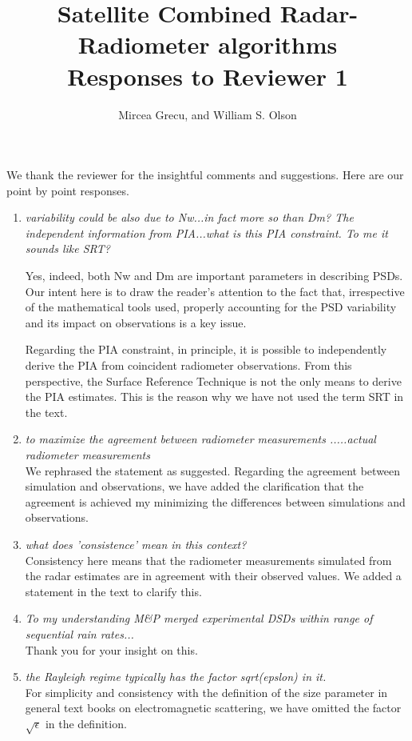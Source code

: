 \documentclass[12pt]{article}
\author{Mircea Grecu, and William S. Olson}
\title{Satellite Combined Radar-Radiometer
algorithms\\
Responses to Reviewer 1}
\date{}
\begin{document}
\maketitle


We thank the reviewer for the insightful comments and suggestions. 
Here are our point by point responses.

\begin{enumerate}
\item	{\textit{variability could be also due to Nw...in fact more so than Dm? The independent information from PIA...what is this PIA constraint. 
To me it sounds like SRT?}

Yes, indeed, both Nw and Dm are important parameters in describing PSDs. Our intent here is to draw the reader's attention to the
fact that, irrespective of the mathematical tools used, properly accounting for the PSD variability and its impact on observations
is a key issue. 

Regarding the PIA constraint, in principle, it is possible to independently derive the PIA from coincident radiometer observations.
From this perspective, the Surface Reference Technique is not the only means to derive the PIA estimates.  This is the reason why
we have not used the term SRT in the text.}

\item {\textit{to maximize the agreement between radiometer 
measurements .....actual radiometer measurements}\\
We rephrased the statement as suggested.  Regarding the agreement between simulation and observations, we have added the clarification
that the agreement is achieved my minimizing the differences between simulations and observations.}

\item {\textit{what does 'consistence' mean in this context?}\\
Consistency here means that the radiometer measurements simulated from the radar estimates are in agreement with their observed values. We added a statement in 
the text to clarify this.}

\item{\textit{To my understanding M\&P merged experimental DSDs within range of sequential rain rates...}\\
Thank you for your insight on this.
}

\item{\textit{the Rayleigh regime typically has the factor sqrt(epslon) in it.}\\
For simplicity and consistency with the definition of the size parameter in general text books on electromagnetic scattering, we have
omitted the factor $\sqrt{\epsilon}$ in the definition.}


\end{enumerate}
\end{document}
